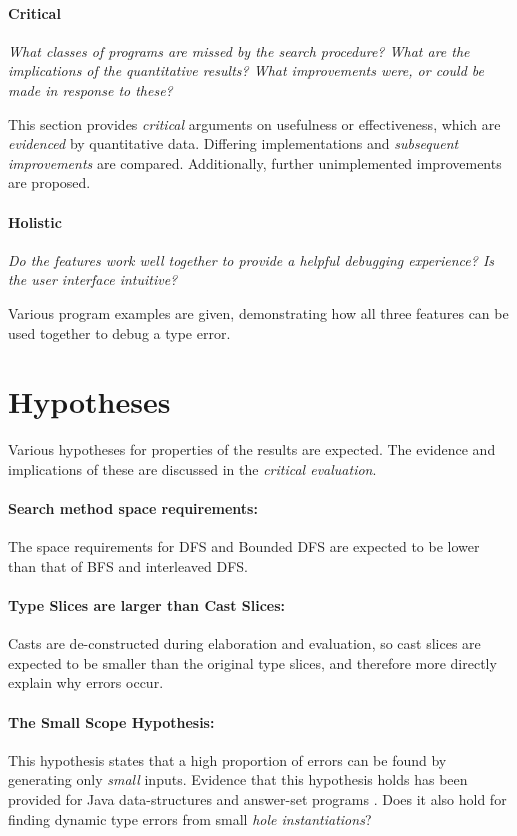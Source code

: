 \paragraph{Critical} \textit{What \textit{classes} of programs are missed by the search procedure? What are the implications of the \textit{quantitative} results? What improvements were, or could be made in response to these?}

This section provides \textit{critical} arguments on {usefulness} or {effectiveness}, which are \textit{evidenced} by quantitative data. Differing implementations and \textit{subsequent improvements} are compared. Additionally, further unimplemented improvements are proposed.

\paragraph{Holistic} \textit{Do the features work well together to provide a helpful debugging experience? Is the user interface intuitive?}

Various program examples are given, demonstrating how all three features can be used together to debug a type error.



\section{Hypotheses}
Various hypotheses for properties of the results are expected. The evidence and implications of these are discussed in the \textit{critical evaluation}.

\paragraph{Search method space requirements: } The space requirements for DFS and Bounded DFS are expected to be lower than that of BFS and interleaved DFS.

\paragraph{Type Slices are larger than Cast Slices: } Casts are de-constructed during elaboration and evaluation, so cast slices are expected to be smaller than the original type slices, and therefore more directly explain why errors occur. 

\paragraph{The Small Scope Hypothesis: }
\label{sec:SmallScopeHypothesis} This hypothesis \cite{SmallScopeHypothesisOrigination} states that a high proportion of errors can be found by generating only \textit{small} inputs. Evidence that this hypothesis holds has been provided for Java data-structures \cite{SmallScopeHypothesis} and answer-set programs \cite{SmallScopeHypothesisAnswerSet}. Does it also hold for finding dynamic type errors from small \textit{hole instantiations}?

